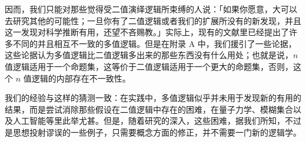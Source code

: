 因而，我们只能对那些觉得受二值演绎逻辑所束缚的人说：「如果你愿意，大可以去研究其他的可能性；一旦你有了二值逻辑或者我们的扩展所没有的新发现，并且这一发现对科学推断有用，还望不吝赐教。」实际上，现有的文献里已经提出了许多不同的并且相互不一致的多值逻辑。但是在附录 A 中，我们援引了一些论据，这些论据认为多值逻辑比二值逻辑多出来的那些东西没有什么用处；也就是说，$n$ 值逻辑适用于一个命题集，这等价于二值逻辑适用于一个更大的命题集，否则，这个 $n$ 值逻辑的内部存在不一致性。

我们的经验与这样的猜测一致：在实践中，多值逻辑似乎并未用于发现新的有用的结果，而是尝试消除那些假设在二值逻辑中存在的困难，在量子力学、模糊集合以及人工智能等里此举尤甚。但是，随着研究的深入，这些困难，据我们所知，不过是思想投射谬误的一些例子，只需要概念方面的修正，并不需要一门新的逻辑学。